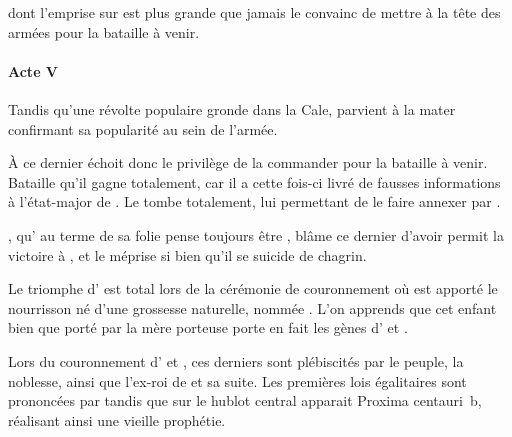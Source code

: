 \ela{} dont l’emprise sur \roi{} est plus grande que jamais le convainc de mettre \elena{} à la tête des armées pour la bataille à venir.

\paragraph{Acte V}
Tandis qu’une révolte populaire gronde dans la Cale, \elena{} parvient à la mater confirmant sa popularité au sein de l’armée.

À ce dernier échoit donc le privilège de la commander pour la bataille à venir. Bataille qu’il gagne totalement, car il a cette fois-ci livré de fausses informations à l’état-major de \campoppose{}. Le \campoppose{} tombe totalement, lui permettant de le faire annexer par \campprincipal{}.

\ela{}, qu’\roi{} au terme de sa folie pense toujours être \princesse{}, blâme ce dernier d’avoir permit la victoire à \elena{}, et le méprise si bien qu’il se suicide de chagrin.

Le triomphe d’\elena{} est total lors de la cérémonie de couronnement où est apporté le nourrisson né d’une grossesse naturelle, nommée \cleopatre{}. L’on apprends que cet enfant bien que porté par la mère porteuse \catin{} porte en fait les gènes d’\elena{} et \ela{}.

Lors du couronnement d’\elena{} et \ela{}, ces derniers sont plébiscités par le peuple, la noblesse, ainsi que l’ex-roi de \campoppose{} et sa suite. Les premières lois égalitaires sont prononcées par \elena{} tandis que sur le hublot central apparait Proxima centauri~b, réalisant ainsi une vieille prophétie.

